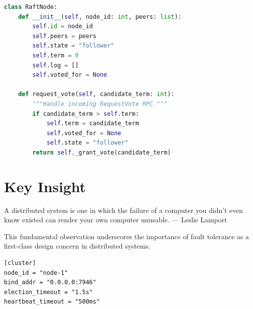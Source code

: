 \documentclass[12pt]{article}
\begin{document}
\begin{lstlisting}[language=Python, caption={Raft node skeleton}]
class RaftNode:
    def __init__(self, node_id: int, peers: list):
        self.id = node_id
        self.peers = peers
        self.state = "follower"
        self.term = 0
        self.log = []
        self.voted_for = None

    def request_vote(self, candidate_term: int):
        """Handle incoming RequestVote RPC."""
        if candidate_term > self.term:
            self.term = candidate_term
            self.voted_for = None
            self.state = "follower"
        return self._grant_vote(candidate_term)
\end{lstlisting}

\section{Key Insight}
\begin{blockquote}
A distributed system is one in which the failure of a computer you
didn't even know existed can render your own computer unusable.
--- Leslie Lamport
\end{blockquote}

\vspace{6pt}

This fundamental observation underscores the importance of fault
tolerance as a first-class design concern in distributed systems.

\begin{lstlisting}[language={}, caption={Minimal configuration}]
[cluster]
node_id = "node-1"
bind_addr = "0.0.0.0:7946"
election_timeout = "1.5s"
heartbeat_timeout = "500ms"
\end{lstlisting}
\end{document}
